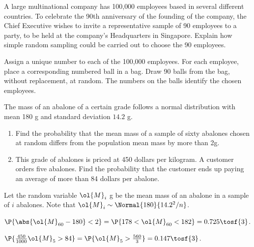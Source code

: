 \begin{problem}
    A large multinational company has 100,000 employees based in several different countries. To celebrate the 90th anniversary of the founding of the company, the Chief Executive wishes to invite a representative sample of 90 employees to a party, to be held at the company's Headquarters in Singapore. Explain how simple random sampling could be carried out to choose the 90 employees.
\end{problem}
\begin{solution}
    Assign a unique number to each of the 100,000 employees. For each employee, place a corresponding numbered ball in a bag. Draw 90 balls from the bag, without replacement, at random. The numbers on the balls identify the chosen employees.
\end{solution}

\begin{problem}
    The mass of an abalone of a certain grade follows a normal distribution with mean 180 g and standard deviation $14.2$ g.

    \begin{enumerate}
        \item Find the probability that the mean mass of a sample of sixty abalones chosen at random differs from the population mean mass by more than 2g.
        \item This grade of abalones is priced at 450 dollars per kilogram. A customer orders five abalones. Find the probability that the customer ends up paying an average of more than 84 dollars per abalone.
    \end{enumerate}
\end{problem}
\begin{solution}
    Let the random variable $\ol{M}_i$ g be the mean mass of an abalone in a sample of $i$ abalones. Note that $\ol{M}_i \sim \Normal{180}{14.2^2 / n}$.

    \begin{ppart}
        $\P{\abs{\ol{M}_{60} - 180} < 2} = \P{178 < \ol{M}_{60} < 182} = 0.725 \tosf{3}$.
    \end{ppart}
    \begin{ppart}
        $\P{\frac{450}{1000} \ol{M}_5 > 84} = \P{\ol{M}_5 > \frac{560}{3}} = 0.147 \tosf{3}$.
    \end{ppart}
\end{solution}

